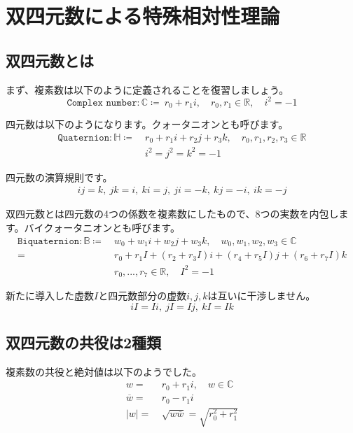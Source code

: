 \documentclass[a4paper,12pt,notitlepage]{jsreport}
\begin{document}
\chapter{双四元数による特殊相対性理論}

\section{双四元数とは}

まず、複素数は以下のように定義されることを復習しましょう。
\begin{equation}
  \texttt{Complex number}:\mathbb{C}\coloneq ~r_0+r_1i,\quad r_0,r_1\in\mathbb{R},\quad i^2=-1
\end{equation}

四元数は以下のようになります。クォータニオンとも呼びます。
\begin{equation}
  \begin{split}
    \texttt{Quaternion}:\mathbb{H}\coloneq ~&r_0+r_1i+r_2j+r_3k,\quad r_0,r_1,r_2,r_3\in\mathbb{R}\\
    &i^2=j^2=k^2=-1
  \end{split}
\end{equation}

四元数の演算規則です。
\begin{gather}
  ij=k,~jk=i,~ki=j,~ji=-k,~kj=-i,~ik=-j
\end{gather}

双四元数とは四元数の4つの係数を複素数にしたもので、8つの実数を内包します。バイクォータニオンとも呼びます。
\begin{equation}
  \begin{split}
    \texttt{Biquaternion}:\mathbb{B}\coloneq ~&w_0+w_1i+w_2j+w_3k,\quad w_0,w_1,w_2,w_3\in\mathbb{C}\\
    =~&r_0+r_1I+(r_2+r_3I)i+(r_4+r_5I)j+(r_6+r_7I)k\\
    &r_0,...,r_7\in\mathbb{R},\quad I^2=-1
  \end{split}
\end{equation}

新たに導入した虚数$I$と四元数部分の虚数$i, j, k$は互いに干渉しません。
\begin{equation}
  iI=Ii,~jI=Ij,~kI=Ik
\end{equation}

\section{双四元数の共役は2種類}

複素数の共役と絶対値は以下のようでした。
\begin{equation}
  \begin{split}
    w=~&r_0+r_1i,\quad w\in\mathbb{C}\\
    \overline{w}=~&r_0-r_1i\\
    |w|=~&\sqrt{w\overline{w}}=\sqrt{r_0^2+r_1^2}
  \end{split}
\end{equation}
\end{document}

